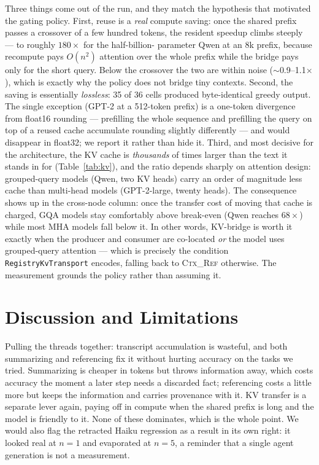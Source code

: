 \documentclass[11pt]{article}
\begin{document}
\noindent Three things come out of the run, and they match the hypothesis that motivated the gating
policy. First, reuse is a \emph{real} compute saving: once the shared prefix passes a crossover of a few
hundred tokens, the resident speedup climbs steeply --- to roughly $180\times$ for the half-billion-
parameter Qwen at an 8k prefix, because recompute pays $O(n^2)$ attention over the whole prefix while
the bridge pays only for the short query. Below the crossover the two are within noise ($\sim$0.9--1.1$\times$),
which is exactly why the policy does not bridge tiny contexts. Second, the saving is essentially
\emph{lossless}: 35 of 36 cells produced byte-identical greedy output. The single exception (GPT-2 at a
512-token prefix) is a one-token divergence from float16 rounding --- prefilling the whole sequence and
prefilling the query on top of a reused cache accumulate rounding slightly differently --- and would
disappear in float32; we report it rather than hide it. Third, and most decisive for the architecture,
the KV cache is \emph{thousands} of times larger than the text it stands in for (Table~\ref{tab:kv}),
and the ratio depends sharply on attention design: grouped-query models (Qwen, two KV heads) carry an
order of magnitude less cache than multi-head models (GPT-2-large, twenty heads). The consequence shows
up in the cross-node column: once the transfer cost of moving that cache is charged, GQA models stay
comfortably above break-even (Qwen reaches $68\times$) while most MHA models fall below it. In other
words, KV-bridge is worth it exactly when the producer and consumer are co-located \emph{or} the model
uses grouped-query attention --- which is precisely the condition \texttt{RegistryKvTransport} encodes,
falling back to \textsc{Ctx\_Ref} otherwise. The measurement grounds the policy rather than assuming it.

\section{Discussion and Limitations}\label{sec:disc}
Pulling the threads together: transcript accumulation is wasteful, and both summarizing and referencing
fix it without hurting accuracy on the tasks we tried. Summarizing is cheaper in tokens but throws
information away, which costs accuracy the moment a later step needs a discarded fact; referencing
costs a little more but keeps the information and carries provenance with it. KV transfer is a separate
lever again, paying off in compute when the shared prefix is long and the model is friendly to it. None
of these dominates, which is the whole point. We would also flag the retracted Haiku regression as a
result in its own right: it looked real at $n{=}1$ and evaporated at $n{=}5$, a reminder that a single
agent generation is not a measurement.
\end{document}
